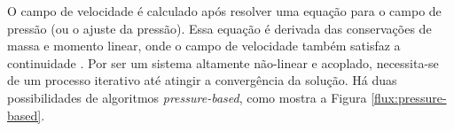 O campo de velocidade é calculado após resolver uma equação para o campo de pressão (ou o ajuste da pressão). Essa equação é derivada das conservações de massa e momento linear, onde o campo de velocidade também satisfaz a continuidade \cite{Chorin68}. Por ser um sistema altamente não-linear e acoplado, necessita-se de um processo iterativo até atingir a convergência da solução. Há duas possibilidades de algoritmos \textit{pressure-based}, como mostra a Figura \ref{flux:pressure-based}. 

\begin{figure}[!ht]
\centering
{} %

\begin{tikzpicture}[x=0.75pt,y=0.75pt,yscale=-1,xscale=1]


\end{tikzpicture}
\end{figure}
